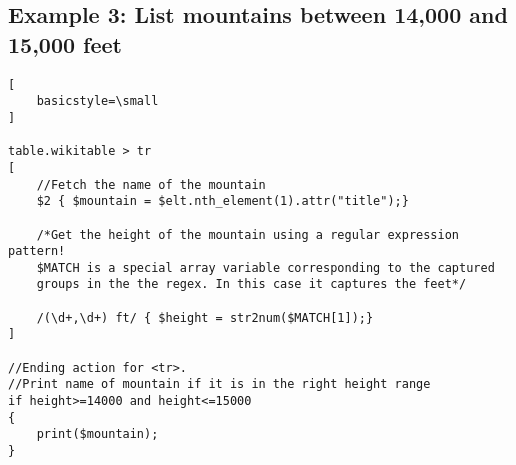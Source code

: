 \documentclass[12pt]{article}
\begin{document}
\subsection*{Example 3: List mountains between 14,000 and 15,000 feet}

\begin{lstlisting}[
    basicstyle=\small
]

table.wikitable > tr
[
	//Fetch the name of the mountain
	$2 { $mountain = $elt.nth_element(1).attr("title");}

	/*Get the height of the mountain using a regular expression pattern! 
	$MATCH is a special array variable corresponding to the captured 
	groups in the the regex. In this case it captures the feet*/
	
	/(\d+,\d+) ft/ { $height = str2num($MATCH[1]);}
]

//Ending action for <tr>.
//Print name of mountain if it is in the right height range
if height>=14000 and height<=15000
{
	print($mountain);
}

\end{lstlisting}
\end{document}
